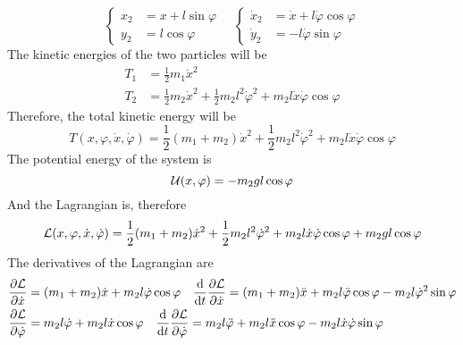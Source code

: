 \documentclass[../admech.tex]{subfiles}
\begin{document}
\begin{exe}
\begin{equation}
		\left\{ \begin{aligned}
			x_2&=x+l\sin\varphi\\
			y_2&=l\cos\varphi
	\end{aligned}\right.\quad\left\{ \begin{aligned}
			\dot{x}_2&=\dot{x}+l\dot{\varphi}\cos\varphi\\
			\dot{y}_2&=-l\dot{\varphi}\sin\varphi
	\end{aligned}\right.
		\label{eq:spt2}
	\end{equation}
	The kinetic energies of the two particles will be
	\begin{equation}
		\begin{aligned}
			T_1&=\frac{1}{2}m_1\dot{x}^2\\
			T_2&=\frac{1}{2}m_2\dot{x}^2+\frac{1}{2}m_2l^2\dot{\varphi}^2+m_2l\dot{x}\dot{\varphi}\cos\varphi
		\end{aligned}
		\label{eq:tsp1}
	\end{equation}
	Therefore, the total kinetic energy will be
	\begin{equation}
		T(x,\varphi,\dot{x},\dot{\varphi})=\frac{1}{2}(m_1+m_2)\dot{x}^2+\frac{1}{2}m_2l^2\dot{\varphi}^2+m_2l\dot{x}\dot{\varphi}\cos\varphi
		\label{eq:tsp}
	\end{equation}
	The potential energy of the system is
	\begin{equation*}
		\mathcal{U}(x,\varphi)=-m_2gl\cos\varphi
	\end{equation*}
	And the Lagrangian is, therefore
	\begin{equation}
		\mathcal{L}(x,\varphi,\dot{x},\dot{\varphi})=\frac{1}{2}(m_1+m_2)\dot{x}^2+\frac{1}{2}m_2l^2\dot{\varphi}^2+m_2l\dot{x}\dot{\varphi}\cos\varphi+m_2gl\cos\varphi
		\label{eq:lagsp}
	\end{equation}
	The derivatives of the Lagrangian are
	\begin{equation}
		\begin{aligned}
			\pdv{\lag}{\dot{x}}&=(m_1+m_2)\dot{x}+m_2l\dot{\varphi}\cos\varphi\quad\dv{t}\pdv{\lag}{\dot{x}}=(m_1+m_2)\ddot{x}+m_2l\ddot{\varphi}\cos{\varphi}-m_2l\dot{\varphi}^2\sin\varphi\\
			\pdv{\lag}{\dot{\varphi}}&=m_2l\dot{\varphi}+m_2l\dot{x}\cos\varphi\quad\dv{t}\pdv{\lag}{\dot{\varphi}}=m_2l\ddot{\varphi}+m_2l\ddot{x}\cos\varphi-m_2l\dot{x}\dot{\varphi}\sin\varphi\\

\end{aligned}
\end{equation}
\end{exe}
\end{document}
